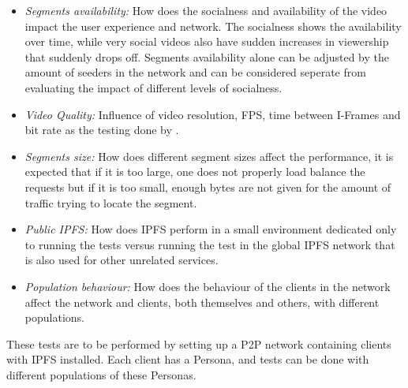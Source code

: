 \begin{itemize}
   \item \textit{Segments availability:}
    How does the socialness and availability of the video impact the user experience and network. The socialness shows the availability over time, while very social videos also have sudden increases in viewership that suddenly drops off. Segments availability alone can be adjusted by the amount of seeders in the network and can be considered seperate from evaluating the impact of different levels of socialness.
    
    \item \textit{Video Quality:}
    Influence of video resolution, \ac{FPS}, time between I-Frames and bit rate as the testing done by \citeauthor{aloman2015performance}.
    
    \item \textit{Segments size:}
    How does different segment sizes affect the performance, it is expected that if it is too large, one does not properly load balance the requests but if it is too small, enough bytes are not given for the amount of traffic trying to locate the segment.

    \item \textit{Public IPFS:}
    How does \ac{IPFS} perform in a small environment dedicated only to running the tests versus running the test in the global \ac{IPFS} network that is also used for other unrelated services.
    
    \item \textit{Population behaviour:}
    How does the behaviour of the clients in the network affect the network and clients, both themselves and others, with different populations.
\end{itemize}

These tests are to be performed by setting up a \ac{P2P} network containing clients with \ac{IPFS} installed. Each client has a Persona, and tests can be done with different populations of these Personas.

